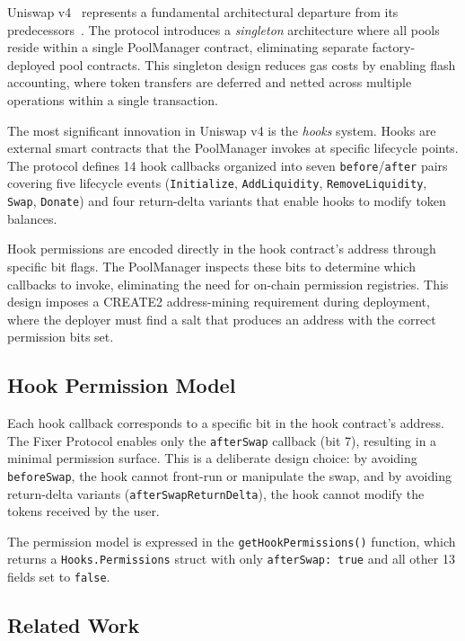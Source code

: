 \documentclass[conference]{IEEEtran}
\begin{document}
Uniswap v4~\cite{uniswapv4} represents a fundamental architectural departure from its predecessors~\cite{uniswapv2,uniswapv3}. The protocol introduces a \textit{singleton} architecture where all pools reside within a single PoolManager contract, eliminating separate factory-deployed pool contracts. This singleton design reduces gas costs by enabling flash accounting, where token transfers are deferred and netted across multiple operations within a single transaction.

The most significant innovation in Uniswap v4 is the \textit{hooks} system. Hooks are external smart contracts that the PoolManager invokes at specific lifecycle points. The protocol defines 14 hook callbacks organized into seven \texttt{before}/\texttt{after} pairs covering five lifecycle events (\texttt{Initialize}, \texttt{Add\-Liquidity}, \texttt{Remove\-Liquidity}, \texttt{Swap}, \texttt{Donate}) and four return-delta variants that enable hooks to modify token balances.

Hook permissions are encoded directly in the hook contract's address through specific bit flags. The PoolManager inspects these bits to determine which callbacks to invoke, eliminating the need for on-chain permission registries. This design imposes a CREATE2 address-mining requirement during deployment, where the deployer must find a salt that produces an address with the correct permission bits set.

\subsection{Hook Permission Model}

Each hook callback corresponds to a specific bit in the hook contract's address. The Fixer Protocol enables only the \texttt{afterSwap} callback (bit 7), resulting in a minimal permission surface. This is a deliberate design choice: by avoiding \texttt{beforeSwap}, the hook cannot front-run or manipulate the swap, and by avoiding return-delta variants (\texttt{after\-Swap\-Return\-Delta}), the hook cannot modify the tokens received by the user.

The permission model is expressed in the \texttt{getHookPermissions()} function, which returns a \texttt{Hooks.Permissions} struct with only \texttt{afterSwap: true} and all other 13 fields set to \texttt{false}.

\subsection{Related Work}
\end{document}
